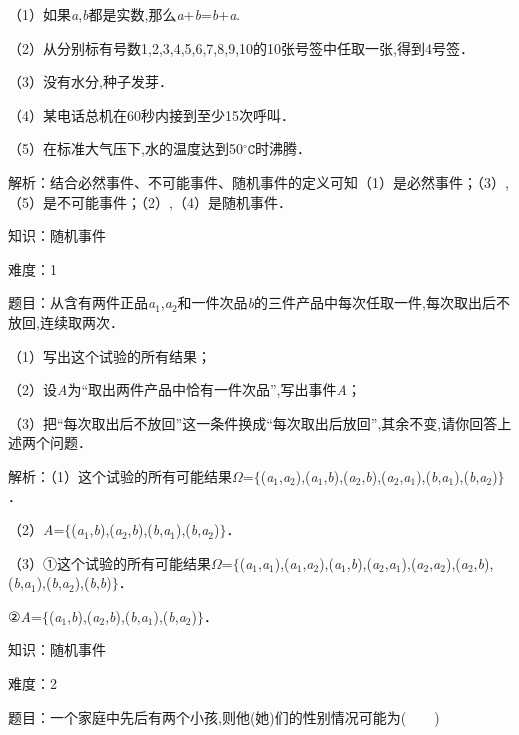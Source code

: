 \documentclass{article} %
\begin{document}
（1）如果\textit{a},\textit{b}都是实数,那么\textit{a}+\textit{b}=\textit{b}+\textit{a}.

（2）从分别标有号数1,2,3,4,5,6,7,8,9,10的10张号签中任取一张,得到4号签．

（3）没有水分,种子发芽．

（4）某电话总机在60秒内接到至少15次呼叫．

（5）在标准大气压下,水的温度达到50$\mathtt{{}^\circ\!{C}}$时沸腾．

解析：结合必然事件、不可能事件、随机事件的定义可知（1）是必然事件；（3）,（5）是不可能事件；（2）,（4）是随机事件．

知识：随机事件

难度：1

题目：从含有两件正品\textit{a}${}_{1}$,\textit{a}${}_{2}$和一件次品\textit{b}的三件产品中每次任取一件,每次取出后不放回,连续取两次．

（1）写出这个试验的所有结果；

（2）设\textit{A}为``取出两件产品中恰有一件次品'',写出事件\textit{A}；

（3）把``每次取出后不放回''这一条件换成``每次取出后放回'',其余不变,请你回答上述两个问题．

解析：（1）这个试验的所有可能结果\textit{$\mathit{\Omega}$}=$\mathrm{\{}$(\textit{a}${}_{1}$,\textit{a}${}_{2}$),(\textit{a}${}_{1}$,\textit{b}),(\textit{a}${}_{2}$,\textit{b}),(\textit{a}${}_{2}$,\textit{a}${}_{1}$),(\textit{b},\textit{a}${}_{1}$),(\textit{b},\textit{a}${}_{2}$)$\mathrm{\}}$．

（2）\textit{A}=$\mathrm{\{}$(\textit{a}${}_{1}$,\textit{b}),(\textit{a}${}_{2}$,\textit{b}),(\textit{b},\textit{a}${}_{1}$),(\textit{b},\textit{a}${}_{2}$)$\mathrm{\}}$．

（3）①这个试验的所有可能结果\textit{$\mathit{\Omega}$}=$\mathrm{\{}$(\textit{a}${}_{1}$,\textit{a}${}_{1}$),(\textit{a}${}_{1}$,\textit{a}${}_{2}$),(\textit{a}${}_{1}$,\textit{b}),(\textit{a}${}_{2}$,\textit{a}${}_{1}$),(\textit{a}${}_{2}$,\textit{a}${}_{2}$),(\textit{a}${}_{2}$,\textit{b}),(\textit{b},\textit{a}${}_{1}$),(\textit{b},\textit{a}${}_{2}$),(\textit{b},\textit{b})$\mathrm{\}}$．

②\textit{A}=$\mathrm{\{}$(\textit{a}${}_{1}$,\textit{b}),(\textit{a}${}_{2}$,\textit{b}),(\textit{b},\textit{a}${}_{1}$),(\textit{b},\textit{a}${}_{2}$)$\mathrm{\}}$．

知识：随机事件

难度：2

题目：一个家庭中先后有两个小孩,则他(她)们的性别情况可能为(　　)
\end{document}
